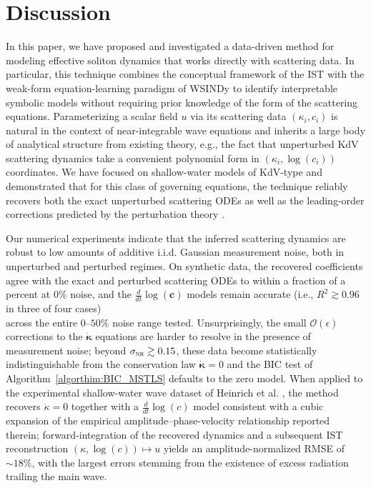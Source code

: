 \documentclass[journal=gmj]{CUP-JNL-DTM}%
\theoremstyle{definition}
\numberwithin{equation}{section}
\begin{document}
\vspace{-2.95 mm}

\section{Discussion}\label{sec:discussion}
\vspace{-1.95 mm}
In this paper, we have proposed and investigated a data-driven method for modeling effective soliton dynamics that works directly with scattering data. In particular, this technique combines the conceptual framework of the IST \cite{Ablowitz.etal1974StudApplMath} with the weak-form equation-learning paradigm of WSINDy \cite{Messenger.Bortz2021MultiscaleModelSimul} to identify interpretable symbolic models without requiring prior knowledge of the form of the scattering equations. Parameterizing a scalar field $u$ via its scattering data $(\kappa_i, c_i)$ is natural in the context of near-integrable wave equations and inherits a large body of analytical structure from existing theory, e.g., the fact that unperturbed KdV scattering dynamics take a convenient polynomial form in $(\kappa_i, \log(c_i))$ coordinates. We have focused on shallow-water models of KdV-type and demonstrated that for this class of governing equations, the technique reliably recovers both the exact unperturbed scattering ODEs as well as the leading-order corrections predicted by the perturbation theory \cite{Karpman.Solovev1981PhysicaDNonlinearPhenomena}.

\smallskip

Our numerical experiments indicate that the inferred scattering dynamics are robust to low amounts of additive i.i.d. Gaussian measurement noise, both in unperturbed and perturbed regimes. On synthetic data, the recovered coefficients agree with the exact and perturbed scattering ODEs to within a fraction of a percent at $0\%$ noise, and the $\tfrac{d}{dt}\log(\mathbf{c})$ models remain accurate (i.e., $R^2 \gtrsim 0.96$ in three of four cases)\\ across the entire $0$--$50\%$ noise range tested. Unsurprisingly, the small $\mathcal{O}(\epsilon)$ corrections to the $\dot{\boldsymbol{\kappa}}$ equations are harder to resolve in the presence of measurement noise; beyond $\sigma_{\textsc{nr}} \gtrsim 0.15$, these data become statistically indistinguishable from the conservation law $\dot{\boldsymbol{\kappa}} = 0$ and the BIC test of Algorithm~\ref{algorthim:BIC_MSTLS} defaults to the zero model. When applied to the experimental shallow-water wave dataset of Heinrich et al. \cite{Heinrich.etal2025, Heinrich.etal2026}, the method recovers $\dot{\kappa} = 0$ together with a $\tfrac{d}{dt}\log(c)$ model consistent with a cubic expansion of the empirical amplitude--phase-velocity relationship reported therein; forward-integration of the recovered dynamics and a subsequent IST reconstruction $(\kappa,\log(c)) \mapsto u$ yields an amplitude-normalized RMSE of $\sim\!18\%$, with the largest errors stemming from the existence of excess radiation trailing the main wave.
\end{document}
